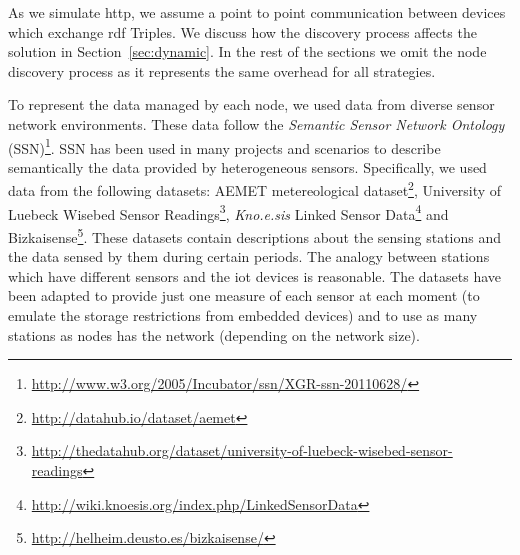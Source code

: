 As we simulate \ac{http}, we assume a point to point communication between devices which exchange \ac{rdf} Triples.
We discuss how the discovery process affects the solution in Section~\ref{sec:dynamic}.
In the rest of the sections we omit the node discovery process as it represents the same overhead for all strategies.


To represent the data managed by each node, we used data from diverse sensor network environments.
These data follow the \textit{Semantic Sensor Network Ontology} (SSN)\footnote{\url{http://www.w3.org/2005/Incubator/ssn/XGR-ssn-20110628/}}.
SSN has been used in many projects and scenarios to describe semantically the data provided by heterogeneous sensors.
Specifically, we used data from the following datasets:
AEMET metereological dataset\footnote{\url{http://datahub.io/dataset/aemet}},
University of Luebeck Wisebed Sensor Readings\footnote{\url{http://thedatahub.org/dataset/university-of-luebeck-wisebed-sensor-readings}},
\emph{Kno.e.sis} Linked Sensor Data\footnote{\url{http://wiki.knoesis.org/index.php/LinkedSensorData}}
and Bizkaisense\footnote{\url{http://helheim.deusto.es/bizkaisense/}}.%
These datasets contain descriptions about the sensing stations and the data sensed by them during certain periods.
The analogy between stations which have different sensors and the \ac{iot} devices is reasonable.
The datasets have been adapted to provide just one measure of each sensor at each moment (to emulate the storage restrictions from embedded devices) and to use as many stations as nodes has the network (depending on the network size).


